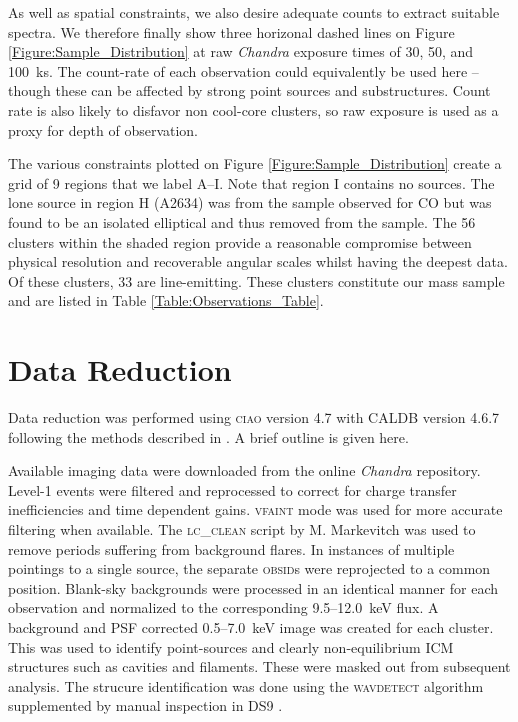 \documentclass[twocolumn]{aastex6}
\begin{document}
As well as spatial constraints, we also desire adequate counts to extract suitable spectra.  We therefore finally show three horizonal dashed lines on Figure \ref{Figure:Sample_Distribution} at raw {\it Chandra} exposure times of 30, 50, and 100~ks.  The count-rate of each observation could equivalently be used here -- though these can be affected by strong point sources and substructures.  Count rate is also likely to disfavor non cool-core clusters, so raw exposure is used as a proxy for depth of observation.

The various constraints plotted on Figure \ref{Figure:Sample_Distribution} create a grid of 9 regions that we label A--I.  Note that region I contains no sources.  The lone source in region H (A2634) was from the sample observed for CO but was found to be an isolated elliptical and thus removed from the sample.  The 56 clusters within the shaded region provide a reasonable compromise between physical resolution and recoverable angular scales whilst having the deepest data.  Of these clusters, 33 are line-emitting.  These clusters constitute our mass sample and are listed in Table \ref{Table:Observations_Table}.


\section{Data Reduction} \label{Section:DataReduction}

Data reduction was performed using \textsc{ciao} version 4.7 with CALDB version 4.6.7 \cite[][]{Fruscione06} following the methods described in \citet[][]{Hogan17}.  A brief outline is given here.

Available imaging data were downloaded from the online {\it Chandra} repository.  Level-1 events were filtered and reprocessed to correct for charge transfer inefficiencies and time dependent gains. \textsc{vfaint} mode was used for more accurate filtering when available.  The \textsc{lc\_clean} script by M. Markevitch was used to remove periods suffering from background flares.  In instances of multiple pointings to a single source, the separate \textsc{obsid}s were reprojected to a common position.  Blank-sky backgrounds were processed in an identical manner for each observation and normalized to the corresponding 9.5--12.0~keV flux.  A background and PSF corrected 0.5--7.0~keV image was created for each cluster.  This was used to identify point-sources and clearly non-equilibrium ICM structures such as cavities and filaments.  These were masked out from subsequent analysis.  The strucure identification was done using the \textsc{wavdetect} \cite[][]{Freeman02} algorithm supplemented by manual inspection in DS9 \cite[][]{Joye03}.
\end{document}

